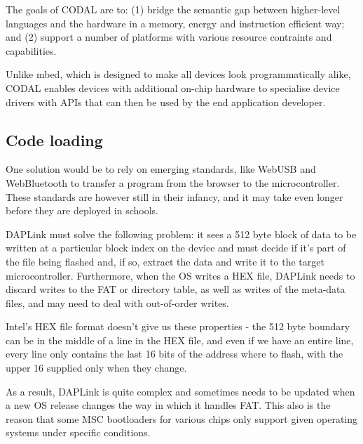 The goals of CODAL are to: (1) bridge the semantic gap between 
higher-level languages and the hardware in a memory, energy and instruction 
efficient way; and (2) support a number of platforms with various
resource contraints and capabilities.

Unlike mbed, which is designed to make all devices look programmatically alike,
CODAL enables devices with additional on-chip hardware to specialise device drivers 
with APIs that can then be used by the end application developer.



\subsection{Code loading}

One solution would be to rely on emerging standards, like WebUSB and WebBluetooth to transfer a program from the browser 
to the microcontroller. These standards are however still in their infancy, and it may take even longer before they are 
deployed in schools.

DAPLink must solve the following problem: it sees a 512 byte block of data to be written
at a particular block index on the device and must decide if it's part of the file being flashed and, if so, extract
the data and write it to the target microcontroller. Furthermore, when the OS writes a HEX file, DAPLink needs to discard
writes to the FAT or directory table, as well as writes of the meta-data files, and may need to deal with out-of-order writes.

Intel's HEX file format doesn't give us these properties 
- the 512 byte boundary can be in the middle of a line in the HEX file, 
and even if we have an entire line, every line only
contains the last 16 bits of the address where to flash, 
with the upper 16 supplied only when they change.

As a result, DAPLink is quite complex and sometimes needs to be updated when a new OS release changes the way
in which it handles FAT. 
This also is the reason that some MSC bootloaders for various chips only support given operating
systems under specific conditions.



